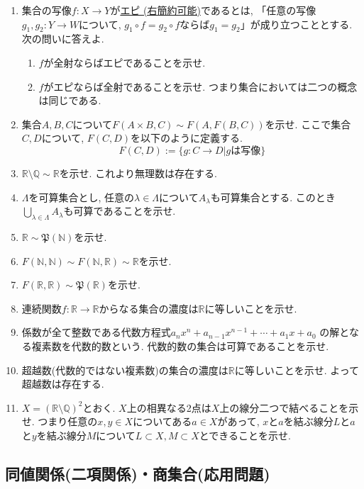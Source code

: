 \documentclass[dvipdfmx,a4paper,11pt]{article}
\newcommand{\R}{\mathbb{R}}
\newcommand{\Q}{\mathbb{Q}}
\newcommand{\N}{\mathbb{N}}
\theoremstyle{definition}
\begin{document}
\begin{enumerate}[label=\textbf{問}\ref*{sec-2}.\arabic*]
\item 集合の写像$f : X \to Y$が\underline{エピ (右簡約可能)}であるとは, 「任意の写像$g_1, g_2 : Y \to W$について, $g_1 \circ f = g_2 \circ f$ならば$g_1=g_2$」が成り立つこととする.
次の問いに答えよ. 
   \begin{enumerate}[label=(\arabic*).]
 \setlength{\parskip}{0cm}
  \setlength{\itemsep}{0pt}
\item $f$が全射ならばエピであることを示せ. 
\item $f$がエピならば全射であることを示せ. つまり集合においては二つの概念は同じである. 
\end{enumerate}
   \item  集合$A, B, C$について$F(A \times B, C) \sim F(A, F(B,C))$を示せ. ここで集合$C, D$について, $F(C,D)$を以下のように定義する.
$$
F(C,D):=\{ g : C \to D |\text{$g$は写像}\}
$$
   \item $\R \setminus \Q \sim \R$を示せ. これより無理数は存在する. 
 \item $\Lambda$を可算集合とし, 任意の$\lambda \in \Lambda$について$A_{\lambda}$も可算集合とする. このとき$\bigcup_{\lambda \in \Lambda}A_{\lambda}$も可算であることを示せ.
 \item $\R \sim \mathfrak{P}(\N)$を示せ.
  \item $F(\N, \N) \sim F(\N, \R)\sim \R$を示せ.
 \item $F(\R, \R)\sim \mathfrak{P}(\R)$を示せ.
 \item 連続関数$f : \R \to \R$からなる集合の濃度は$\R$に等しいことを示せ. 
 \item 係数が全て整数である代数方程式$a_n x^n + a_{n-1}x^{n-1} + \cdots + a_1 x + a_0$
 の解となる複素数を代数的数という. 代数的数の集合は可算であることを示せ. 
 \item 超越数(代数的ではない複素数)の集合の濃度は$\R$に等しいことを示せ. よって超越数は存在する. 
 \item $X = (\R \setminus \Q)^2$とおく. $X$上の相異なる2点は$X$上の線分二つで結べることを示せ. つまり任意の$x, y \in X$についてある$a \in X$があって, $x$と$a$を結ぶ線分$L$と$a$と$y$を結ぶ線分$M$について$L \subset X, M \subset X$とできることを示せ.
 \end{enumerate}

 \newpage

 \begin{center}
\section{同値関係(二項関係)・商集合(応用問題)}
\label{sec-6}
\end{center}
\end{document}
